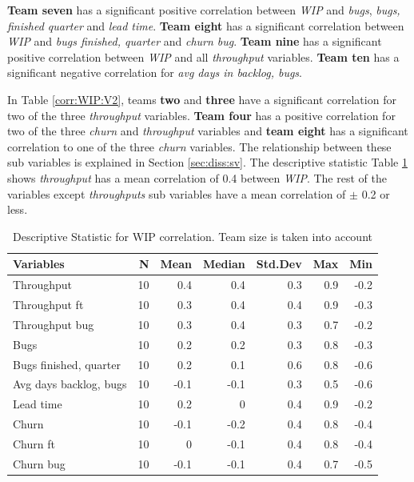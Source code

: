 \documentclass[UKenglish]{ifimaster}  %
\begin{document}
\textbf{Team seven} has a significant positive correlation between \textit{WIP} and \textit{bugs}, \textit{bugs, finished quarter} and \textit{lead time}. \textbf{Team eight} has a significant correlation between \textit{WIP} and \textit{bugs finished, quarter} and \textit{churn bug}. \textbf{Team nine} has a significant positive correlation between \textit{WIP} and all \textit{throughput} variables. \textbf{Team ten} has a significant negative correlation for \textit{avg days in backlog, bugs}.

In Table \ref{corr:WIP:V2}, teams \textbf{two} and \textbf{three} have a significant correlation  for two of the three \textit{throughput} variables. \textbf{Team four} has a positive correlation for two of the three \textit{churn} and \textit{throughput} variables and \textbf{team eight} has a significant correlation to one of the three \textit{churn} variables. The relationship between these sub variables is explained in Section \ref{sec:diss:sv}. The descriptive statistic Table \ref{DS:corr:WIP:v2} shows \textit{throughput} has a mean correlation of 0.4 between \textit{WIP}. The rest of the variables except \textit{throughputs} sub variables have a mean correlation of $\pm$ 0.2 or less. 


\begin{minipage}[t]{\linewidth}
\begin{table}[H]
 \caption{Descriptive Statistic for WIP correlation. Team size is taken into account}
 \centering
 \begin{tabular}{ | l | r | r | r | r | r | r | }
 \hline
\textbf{Variables}& \bf{N} & \bf{Mean} & \bf{Median} & \bf{Std.Dev} & \bf{Max} & \bf{Min} \\ \hline
Throughput  & 10 & 0.4 & 0.4 & 0.3 & 0.9 & -0.2\\ \hline
Throughput ft  & 10 & 0.3 & 0.4 & 0.4 & 0.9 & -0.3\\ \hline
Throughput bug  & 10 & 0.3 & 0.4 & 0.3 & 0.7 & -0.2\\ \hline
Bugs  & 10 & 0.2 & 0.2 & 0.3 & 0.8 & -0.3\\ \hline
Bugs finished, quarter  & 10 & 0.2 & 0.1 & 0.6 & 0.8 & -0.6\\ \hline
Avg days backlog, bugs  & 10 & -0.1 & -0.1 & 0.3 & 0.5 & -0.6\\ \hline
Lead time & 10 & 0.2 & 0 & 0.4 & 0.9 & -0.2\\ \hline
Churn  & 10 & -0.1 & -0.2 & 0.4 & 0.8 & -0.4\\ \hline
Churn ft  & 10 & 0 & -0.1 & 0.4 & 0.8 & -0.4\\ \hline
Churn bug  & 10 & -0.1 & -0.1 & 0.4 & 0.7 & -0.5\\ \hline
\end{tabular}
 \label{DS:corr:WIP:v2}
 \end{table}
\end{minipage}
\end{document}

